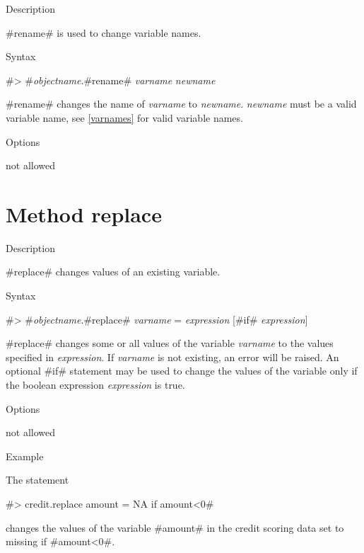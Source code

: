 \begin{stanza}{Description}

#rename# is used to change variable names.
\end{stanza}


\begin{stanza}{Syntax}

#> #{\em objectname}.#rename# {\em varname} {\em newname}

#rename# changes the name of {\em varname} to {\em newname}. {\em
newname} must be a valid variable name, see \autoref{varnames} for
valid variable names.
\end{stanza}

\begin{stanza}{Options}

not allowed

\end{stanza}

\clearpage



\section{Method replace}
\label{replace} 



\begin{stanza}{Description}

{#replace# changes values of an existing variable.}
\end{stanza}


\begin{stanza}{Syntax}

 #> #{\em objectname}.#replace# {\em varname} = {\em expression} [#if# {\em expression}]

#replace# changes some or all values of the variable {\em varname}
to the values specified in {\em expression}. If {\em varname} is
not existing, an error will be raised. An optional #if# statement
may be used to change the values of the variable only if the
boolean expression {\em expression} is true.
\end{stanza}


\begin{stanza}{Options}

not allowed
\end{stanza}


\begin{stanza}{Example}

The statement

#> credit.replace amount = NA if amount<0#

changes the values of the variable #amount# in the credit scoring
data set to missing if #amount<0#.
\end{stanza}



